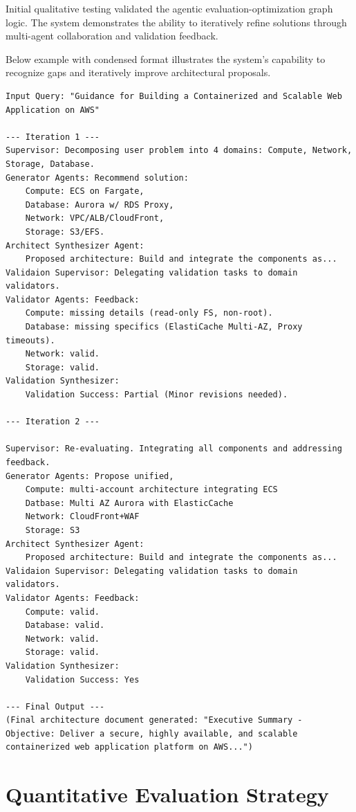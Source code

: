 Initial qualitative testing validated the agentic evaluation-optimization graph logic. The system demonstrates the ability to iteratively refine solutions through multi-agent collaboration and validation feedback.

Below example with condensed format illustrates the system’s capability to recognize gaps and iteratively improve architectural proposals.

\begin{verbatim}
Input Query: "Guidance for Building a Containerized and Scalable Web Application on AWS" 

--- Iteration 1 --- 
Supervisor: Decomposing user problem into 4 domains: Compute, Network, Storage, Database. 
Generator Agents: Recommend solution:
    Compute: ECS on Fargate,
    Database: Aurora w/ RDS Proxy, 
    Network: VPC/ALB/CloudFront, 
    Storage: S3/EFS. 
Architect Synthesizer Agent:
    Proposed architecture: Build and integrate the components as...
Validaion Supervisor: Delegating validation tasks to domain validators.
Validator Agents: Feedback: 
    Compute: missing details (read-only FS, non-root). 
    Database: missing specifics (ElastiCache Multi-AZ, Proxy timeouts). 
    Network: valid.
    Storage: valid.
Validation Synthesizer:
    Validation Success: Partial (Minor revisions needed). 

--- Iteration 2 --- 

Supervisor: Re-evaluating. Integrating all components and addressing feedback. 
Generator Agents: Propose unified, 
    Compute: multi-account architecture integrating ECS
    Datbase: Multi AZ Aurora with ElasticCache
    Network: CloudFront+WAF 
    Storage: S3
Architect Synthesizer Agent:
    Proposed architecture: Build and integrate the components as...
Validaion Supervisor: Delegating validation tasks to domain validators.
Validator Agents: Feedback: 
    Compute: valid.
    Database: valid.
    Network: valid.
    Storage: valid.
Validation Synthesizer:
    Validation Success: Yes 
    
--- Final Output --- 
(Final architecture document generated: "Executive Summary - Objective: Deliver a secure, highly available, and scalable containerized web application platform on AWS...")
\end{verbatim}

\section{Quantitative Evaluation Strategy}

